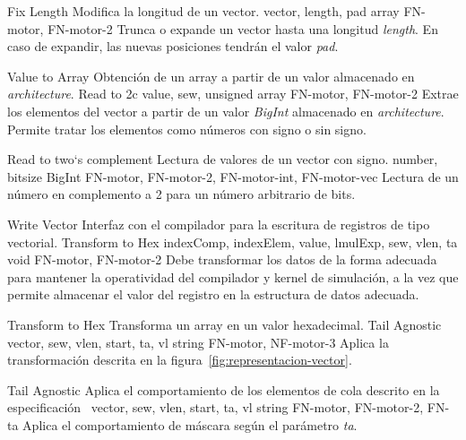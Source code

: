 \begin{component}{Fix Length} %
{Modifica la longitud de un vector.}
{\NA}
{vector, length, pad}
{array}
{FN-motor, FN-motor-2}
Trunca o expande un vector hasta una longitud \textit{length}. En caso de expandir, las nuevas posiciones tendrán el valor \textit{pad}.
\end{component}

\begin{component}{Value to Array} %
{Obtención de un array a partir de un valor almacenado en \textit{architecture}.}
{Read to 2c}
{value, sew, unsigned}
{array}
{FN-motor, FN-motor-2}
Extrae los elementos del vector a partir de un valor \textit{BigInt} almacenado en \textit{architecture}. Permite tratar los elementos como números con signo o sin signo.
\end{component}

\begin{component}{Read to two`s complement} %
{Lectura de valores de un vector con signo.}
{\NA}
{number, bitsize}
{BigInt}
{FN-motor, FN-motor-2, FN-motor-int, FN-motor-vec}
Lectura de un número en complemento a 2 para un número arbitrario de bits.
\end{component}

\begin{component}{Write Vector} %
{Interfaz con el compilador para la escritura de registros de tipo vectorial.}
{Transform to Hex}
{indexComp, indexElem, value, lmulExp, sew, vlen, ta}
{void}
{FN-motor, FN-motor-2}
Debe transformar los datos de la forma adecuada para mantener la operatividad del compilador y kernel de simulación, a la vez que permite almacenar el valor del registro en la estructura de datos adecuada.
\end{component}

\begin{component}{Transform to Hex} %
{Transforma un array en un valor hexadecimal.}
{Tail Agnostic}
{vector, sew, vlen, start, ta, vl}
{string}
{FN-motor, NF-motor-3}
Aplica la transformación descrita en la figura~\ref{fig:representacion-vector}.
\end{component}

\begin{component}{Tail Agnostic} %
{Aplica el comportamiento de los elementos de cola descrito en la especificación~\cite{riscv-isa2024}}
{\NA}
{vector, sew, vlen, start, ta, vl}
{string}
{FN-motor, FN-motor-2, FN-ta}
Aplica el comportamiento de máscara según el parámetro \textit{ta}.
\end{component}

